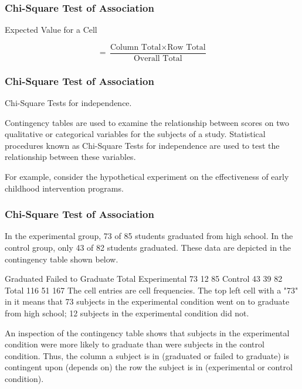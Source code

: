 \begin{frame}
\frametitle{Chi-Square Test of Association}

\Large
Expected Value for a Cell

\[ = \frac{\mbox{Column Total}  \times \mbox{Row Total} } {\mbox{Overall Total}}  \]

\end{frame}

\begin{frame}
\frametitle{Chi-Square Test of Association}

\Large


 
Chi-Square Tests for independence.
 
Contingency tables are used to examine the relationship between scores on two qualitative or categorical variables for the subjects of a study. Statistical procedures known as Chi-Square Tests for independence are used to test the relationship between these variables.
 
For example, consider the hypothetical experiment on the effectiveness of early childhood intervention programs.
 
 \end{frame}

\begin{frame}
\frametitle{Chi-Square Test of Association}

\Large

In the experimental group, 73 of 85 students graduated from high school. In the control group, only 43 of 82 students graduated. These data are depicted in the contingency table shown below. 
 
 
 
Graduated
Failed to
Graduate
Total
Experimental
73
12
85
Control
43
39
82
Total
116
51
167
The cell entries are cell frequencies. The top left cell with a "73" in it means that 73 subjects in the experimental condition went on to graduate from high school; 12 subjects in the experimental condition did not.
 
An inspection of the contingency table shows that subjects in the experimental condition were more likely to graduate than were subjects in the control condition. Thus, the column a subject is in (graduated or failed to graduate) is contingent upon (depends on) the row the subject is in (experimental or control condition). 
 
 \end{frame}

